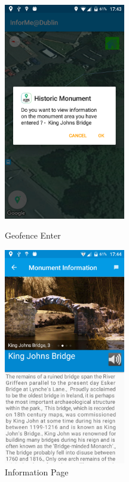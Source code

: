 \begin{figure}[!tbp]
	\centering
	\begin{minipage}[b]{0.4\textwidth}
		\includegraphics[width=150pt]{Geofence-Enter}
		\caption{Geofence Enter}
		\label{Figure: Geofence Enter}
	\end{minipage}
	\hfill
	\begin{minipage}[b]{0.4\textwidth}
		\includegraphics[width=150pt]{Information-Page}
		\caption{Information Page} 
		\label{Figure: Information Page}
	\end{minipage}
\end{figure}

